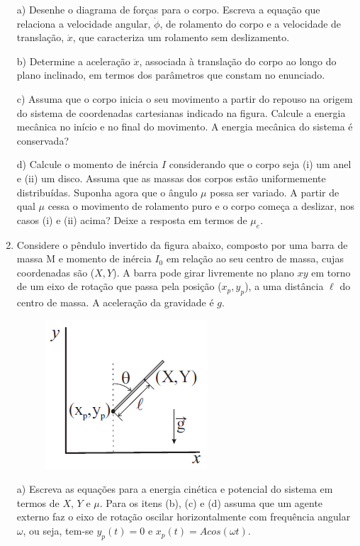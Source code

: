 \begin{enumerate}[start=1,label={\bfseries Q\arabic*.}]
a) Desenhe o diagrama de forças para o corpo. Escreva a equação que relaciona a velocidade angular, $\dot{\phi}$, de rolamento do corpo e a velocidade de translação, $\dot{x}$, que caracteriza um rolamento sem deslizamento.

\resposta

b) Determine a aceleração $\ddot{x}$, associada à translação do corpo ao longo do plano inclinado, em termos dos parâmetros que constam no enunciado.

\resposta

c) Assuma que o corpo inicia o seu movimento a partir do repouso na origem do sistema de coordenadas cartesianas indicado na figura. Calcule a energia mecânica no início e no final do movimento. A energia mecânica do sistema é conservada?

\resposta

d) Calcule o momento de inércia $I$ considerando que o corpo seja (i) um anel e (ii) um disco. Assuma que as massas dos corpos estão uniformemente distribuídas. Suponha agora que o ângulo $\mu$ possa ser variado. A partir de qual $\mu$ cessa o movimento de rolamento puro e o corpo começa a deslizar, nos casos (i) e (ii) acima? Deixe a resposta em termos de $\mu_{e}$.

\resposta


\item Considere o pêndulo invertido da figura abaixo, composto por uma barra de massa M e momento de inércia $I_{0}$ em relação ao seu centro de massa, cujas coordenadas são ($X,Y$). A barra pode girar livremente no plano $xy$ em torno de um eixo de rotação que passa pela posição ($x_{p},y_{p}$), a uma distância $\ell$ do centro de massa. A aceleração da gravidade é $g$.
\begin{figure}[H]
\centering
\includegraphics[scale=0.8]{classica-img/pendulo5.png}
\end{figure}

a) Escreva as equações para a energia cinética e potencial do sistema em termos de $X$, $Y$ e $\mu$. Para os itens (b), (c) e (d) assuma que um agente externo faz o eixo de rotação oscilar horizontalmente com frequência angular $\omega$, ou seja, tem-se $y_{p}(t) = 0$ e $x_{p}(t) = A cos(\omega t)$.


\end{enumerate}
